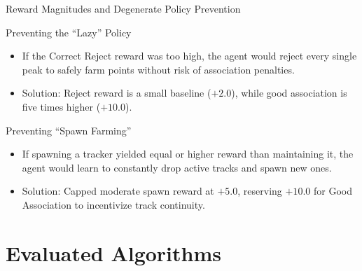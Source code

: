 \documentclass[10pt]{beamer}
\begin{document}
\begin{frame}{Reward Magnitudes and Degenerate Policy Prevention}
    \begin{block}{Preventing the ``Lazy'' Policy}
        \begin{itemize}
            \item If the Correct Reject reward was too high, the agent would reject every single peak to safely farm points without risk of association penalties. 
            \item Solution: Reject reward is a small baseline ($+2.0$), while good association is five times higher ($+10.0$).
        \end{itemize}
    \end{block}
    \begin{block}{Preventing ``Spawn Farming''}
        \begin{itemize}
            \item If spawning a tracker yielded equal or higher reward than maintaining it, the agent would learn to constantly drop active tracks and spawn new ones.
            \item Solution: Capped moderate spawn reward at $+5.0$, reserving $+10.0$ for Good Association to incentivize track continuity.
        \end{itemize}
    \end{block}
\end{frame}

\section{Evaluated Algorithms}
\end{document}
